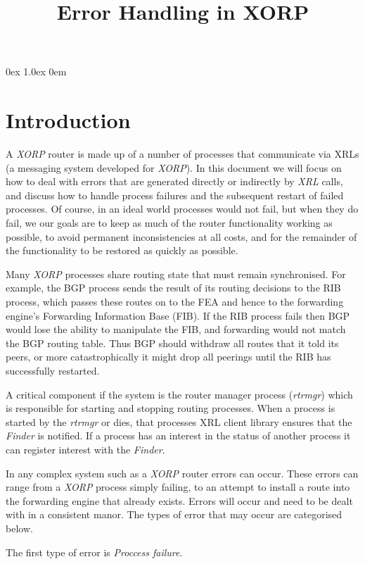 \documentclass[11pt]{article}
\title{Error Handling in XORP}
\makeatletter
\newcommand{\xorp} {{\em XORP}\@\xspace}
\newcommand{\finder} {{\em Finder}\@\xspace}
\newcommand{\xrl} {{\em XRL}\@\xspace}
\newcommand{\rtrmgr} {{\em rtrmgr}\@\xspace}
\makeatother
\begin{document}
\parsep 0ex
\parskip 1.0ex
\parindent 0em
\noindent
\maketitle                            
\section{Introduction}

A \xorp router is made up of a number of processes that communicate
via XRLs \cite{xorp:xrl} (a messaging system developed for \xorp). In
this document we will focus on how to deal with errors that are
generated directly or indirectly by \xrl calls, and discuss how to
handle process failures and the subsequent restart of failed
processes.  Of course, in an ideal world processes would not fail, but
when they do fail, we our goals are to keep as much of the router
functionality working as possible, to avoid permanent inconsistencies
at all costs, and for the remainder of the functionality to be
restored as quickly as possible.

Many \xorp processes share routing state that must remain
synchronised. For example, the BGP process sends the result of its
routing decisions to the RIB process, which passes these routes on to
the FEA and hence to the forwarding engine's Forwarding Information
Base (FIB). If the RIB process fails then BGP would lose the ability
to manipulate the FIB, and forwarding would not match the BGP routing
table.  Thus BGP should withdraw all routes that it told its peers, or
more catastrophically it might drop all peerings until the RIB has
successfully restarted.

A critical component if the system is the router manager process
(\rtrmgr) which is responsible for starting and stopping routing
processes. When a process is started by the \rtrmgr or dies, that
processes XRL client library ensures that the \finder is notified. If
a process has an interest in the status of another process it can
register interest with the \finder.

In any complex system such as a \xorp router errors can occur. These
errors can range from a \xorp process simply failing, to an attempt to
install a route into the forwarding engine that already exists. Errors
will occur and need to be dealt with in a consistent manor. The types
of error that may occur are categorised below.

The first type of error is {\em Proccess failure}.
\end{document}
